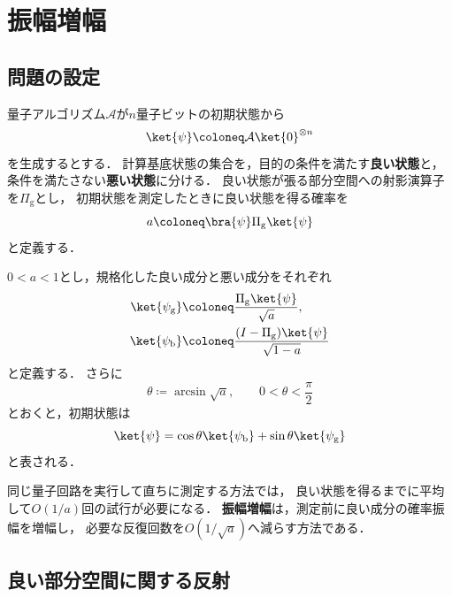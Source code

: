 \section{振幅増幅}
\label{sec:amplitude-amplification}

\subsection{問題の設定}
\label{subsec:amplitude-amplification-setting}

量子アルゴリズム$\mathcal{A}$が$n$量子ビットの初期状態から
\begin{equation}
  \ket{\psi}
  \coloneq
  \mathcal{A}\ket{0}^{\otimes n}
  \label{eq:amplitude-amplification-initial-state}
\end{equation}
を生成するとする．
計算基底状態の集合を，目的の条件を満たす\textbf{良い状態}と，
条件を満たさない\textbf{悪い状態}に分ける．
良い状態が張る部分空間への射影演算子を$\Pi_{\mathrm{g}}$とし，
初期状態を測定したときに良い状態を得る確率を
\begin{equation}
  a
  \coloneq
  \bra{\psi}\Pi_{\mathrm{g}}\ket{\psi}
  \label{eq:initial-good-probability}
\end{equation}
と定義する．

$0<a<1$とし，規格化した良い成分と悪い成分をそれぞれ
\begin{align}
  \ket{\psi_{\mathrm{g}}}
  &\coloneq
  \frac{\Pi_{\mathrm{g}}\ket{\psi}}{\sqrt{a}},
  \label{eq:normalized-good-state}\\
  \ket{\psi_{\mathrm{b}}}
  &\coloneq
  \frac{(I-\Pi_{\mathrm{g}})\ket{\psi}}{\sqrt{1-a}}
  \label{eq:normalized-bad-state}
\end{align}
と定義する．
さらに
\begin{equation}
  \theta
  \coloneq
  \arcsin\sqrt{a},
  \qquad
  0<\theta<\frac{\pi}{2}
  \label{eq:amplification-angle}
\end{equation}
とおくと，初期状態は
\begin{equation}
  \ket{\psi}
  =
  \cos\theta\ket{\psi_{\mathrm{b}}}
  +\sin\theta\ket{\psi_{\mathrm{g}}}
  \label{eq:good-bad-decomposition}
\end{equation}
と表される．

同じ量子回路を実行して直ちに測定する方法では，
良い状態を得るまでに平均して$O(1/a)$回の試行が必要になる．
\textbf{振幅増幅}は，測定前に良い成分の確率振幅を増幅し，
必要な反復回数を$O(1/\sqrt{a})$へ減らす方法である\cite{brassard2002}．

\subsection{良い部分空間に関する反射}
\label{subsec:good-subspace-reflection}

